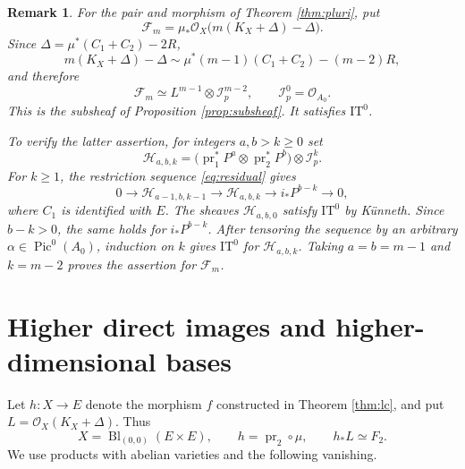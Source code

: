 \documentclass[11pt,letterpaper]{article}
\theoremstyle{paper}
\newtheorem{remark}[theorem]{Remark}
\newcommand{\OO}{\mathcal O}
\newcommand{\FF}{\mathcal F}
\newcommand{\II}{\mathcal I}
\DeclareMathOperator{\Pic}{Pic}
\DeclareMathOperator{\pr}{pr}
\DeclareMathOperator{\Bl}{Bl}
\begin{document}
\begin{remark}\label{rem:plurisubsheaf}
For the pair and morphism of Theorem \ref{thm:pluri}, put
\[
\FF_m=\mu_*\OO_X\bigl(m(K_X+\Delta)-\Delta\bigr).
\]
Since $\Delta=\mu^*(C_1+C_2)-2R$,
\[
m(K_X+\Delta)-\Delta\sim\mu^*(m-1)(C_1+C_2)-(m-2)R,
\]
and therefore
\[
\FF_m\simeq L^{m-1}\otimes\II_p^{m-2},\qquad \II_p^0=\OO_{A_0}.
\]
This is the subsheaf of Proposition \ref{prop:subsheaf}. It satisfies $\mathrm{IT}^0$.

To verify the latter assertion, for integers $a,b>k\ge0$ set
\[
\mathcal H_{a,b,k}=\bigl(\pr_1^*P^a\otimes\pr_2^*P^b\bigr)\otimes\II_p^k.
\]
For $k\ge1$, the restriction sequence \eqref{eq:residual} gives
\[
0\longrightarrow\mathcal H_{a-1,b,k-1}\longrightarrow\mathcal H_{a,b,k}
\longrightarrow i_*P^{b-k}\longrightarrow0,
\]
where $C_1$ is identified with $E$. The sheaves $\mathcal H_{a,b,0}$ satisfy $\mathrm{IT}^0$ by K\"unneth. Since $b-k>0$, the same holds for $i_*P^{b-k}$. After tensoring the sequence by an arbitrary $\alpha\in\Pic^0(A_0)$, induction on $k$ gives $\mathrm{IT}^0$ for $\mathcal H_{a,b,k}$. Taking $a=b=m-1$ and $k=m-2$ proves the assertion for $\FF_m$.
\end{remark}

\section{Higher direct images and higher-dimensional bases}
Let $h:X\to E$ denote the morphism $f$ constructed in Theorem \ref{thm:lc}, and put $L=\OO_X(K_X+\Delta)$. Thus
\[
X=\Bl_{(0,0)}(E\times E),\qquad h=\pr_2\circ\mu,\qquad h_*L\simeq F_2.
\]
We use products with abelian varieties and the following vanishing.
\end{document}
